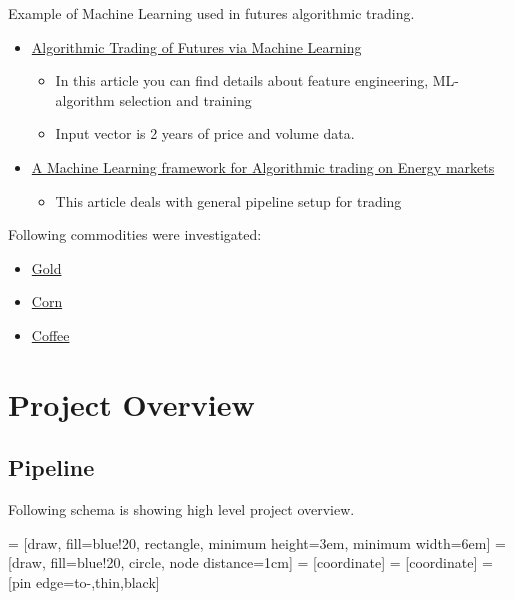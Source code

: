 \documentclass[final,2p]{elsarticle}
\begin{document}
Example of Machine Learning used in futures algorithmic trading.
\begin{itemize}
    \item \href{http://cs229.stanford.edu/proj2014/David\%20Montague,\%20Algorithmic\%20Trading\%20of\%20Futures\%20via\%20Machine\%20Learning.pdf}{Algorithmic Trading of Futures via Machine Learning}
        \begin{itemize}
            \item In this article you can find details about feature engineering, ML-algorithm selection and training
            \item Input vector is 2 years of price and volume data.
        \end{itemize}
    \item \href{https://towardsdatascience.com/https-medium-com-skuttruf-machine-learning-in-finance-algorithmic-trading-on-energy-markets-cb68f7471475}{A Machine Learning framework for Algorithmic trading on Energy markets}
        \begin{itemize}
            \item This article deals with general pipeline setup for trading
        \end{itemize}
\end{itemize}

Following commodities were investigated:
\begin{itemize}
    \item \href{https://www.cmegroup.com/trading/metals/precious/gold.html}{Gold}
    \item \href{https://www.cmegroup.com/trading/agricultural/grain-and-oilseed/corn.html}{Corn}
    \item \href{https://www.cmegroup.com/trading/agricultural/softs/coffee.html}{Coffee}
\end{itemize}
\clearpage

\section{Project Overview}

\subsection{Pipeline}
Following schema is showing high level project overview.
\newline

 = [draw, fill=blue!20, rectangle, 
    minimum height=3em, minimum width=6em]
 = [draw, fill=blue!20, circle, node distance=1cm]
 = [coordinate]
 = [coordinate]
 = [pin edge={to-,thin,black}]
\end{document}
